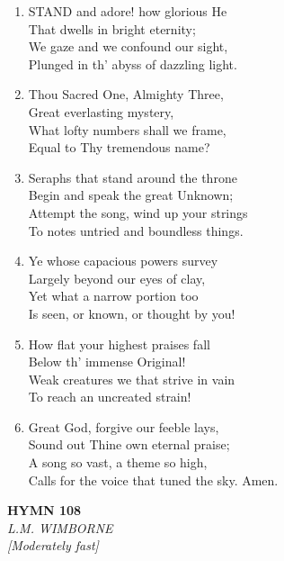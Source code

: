 \documentclass[11pt,a4paper]{article}
\begin{document}
\begin{enumerate}
    \item STAND and adore! how glorious He \\
        That dwells in bright eternity; \\
        We gaze and we confound our sight, \\
        Plunged in th' abyss of dazzling light.

    \item Thou Sacred One, Almighty Three, \\
        Great everlasting mystery, \\
        What lofty numbers shall we frame, \\
        Equal to Thy tremendous name?

    \item Seraphs that stand around the throne \\
        Begin and speak the great Unknown; \\
        Attempt the song, wind up your strings \\
        To notes untried and boundless things.

    \item Ye whose capacious powers survey \\
        Largely beyond our eyes of clay, \\
        Yet what a narrow portion too \\
        Is seen, or known, or thought by you!

    \item How flat your highest praises fall \\
        Below th' immense Original! \\
        Weak creatures we that strive in vain \\
        To reach an uncreated strain!

    \item Great God, forgive our feeble lays, \\
        Sound out Thine own eternal praise; \\
        A song so vast, a theme so high, \\
        Calls for the voice that tuned the sky. Amen.

\end{enumerate}

\newpage
\begin{center}
    {\Large \textbf{HYMN 108}}
    \\
    \textit{L.M. WIMBORNE}
    \\
    \textit{\small [Moderately fast]}
\end{center}
\vspace{1em}
\end{document}
